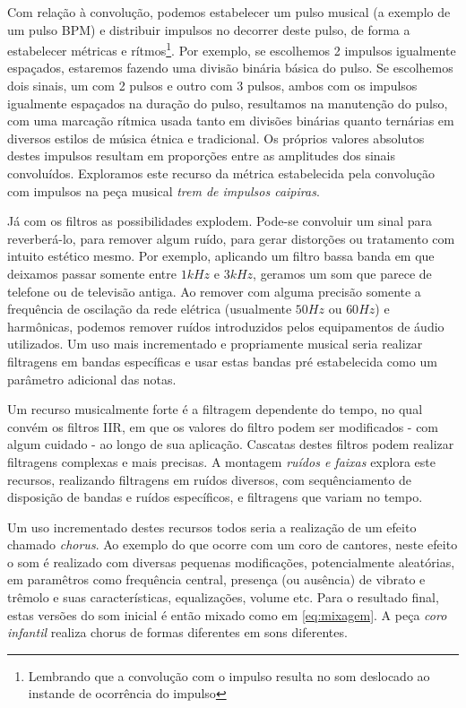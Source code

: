 Com relação à convolução, podemos estabelecer um pulso musical (a exemplo de um pulso BPM)
e distribuir impulsos no decorrer deste pulso, de forma a estabelecer métricas e rítmos\footnote{Lembrando
que a convolução com o impulso resulta no som deslocado ao instande de ocorrência do impulso}.
Por exemplo, se escolhemos 2 impulsos igualmente espaçados, estaremos fazendo uma
divisão binária básica do pulso. Se escolhemos dois sinais, um com 2 pulsos e outro com 3 pulsos,
ambos com os impulsos igualmente espaçados na duração do pulso, resultamos na manutenção
do pulso, com uma marcação rítmica usada tanto em divisões binárias quanto ternárias em diversos
estilos de música étnica e tradicional. 
Os próprios valores absolutos destes impulsos resultam em proporções entre as amplitudes dos sinais
convoluídos.
Exploramos este recurso da métrica
estabelecida pela convolução com impulsos na peça musical \emph{trem de impulsos caipiras}.

Já com os filtros as possibilidades explodem. Pode-se convoluir um sinal para reverberá-lo, para
remover algum ruído, para gerar distorções ou tratamento com intuito estético mesmo. Por exemplo,
aplicando um filtro bassa banda em que deixamos passar somente entre $1kHz$ e $3kHz$, geramos um som
que parece de telefone ou de televisão antiga. Ao remover com alguma precisão somente
a frequência de oscilação da rede elétrica (usualmente $50Hz$ ou $60Hz$) e harmônicas, podemos remover
ruídos introduzidos pelos equipamentos de áudio utilizados. Um uso mais incrementado
e propriamente musical seria realizar filtragens em bandas específicas e usar estas bandas
pré estabelecida como um parâmetro adicional das notas.

Um recurso musicalmente forte é a filtragem dependente do tempo, no qual convém os filtros IIR, em que
os valores do filtro podem ser modificados - com algum cuidado - ao longo de sua aplicação. Cascatas
destes filtros podem realizar filtragens complexas e mais precisas. A montagem \emph{ruídos e faixas} explora
este recursos, realizando filtragens em ruídos diversos, com sequênciamento de disposição de bandas
e ruídos específicos, e filtragens que variam no tempo.

Um uso incrementado destes recursos todos seria a realização de um efeito chamado \emph{chorus}. Ao
exemplo do que ocorre com um coro de cantores, neste efeito o som é realizado com diversas pequenas modificações,
potencialmente aleatórias, em paramêtros como frequência central, presença (ou ausência) de vibrato
e trêmolo e suas características, equalizações, volume etc. Para o resultado final, estas versões do som
inicial é então mixado como em \ref{eq:mixagem}. A peça \emph{coro infantil} realiza chorus de formas
diferentes em sons diferentes.




